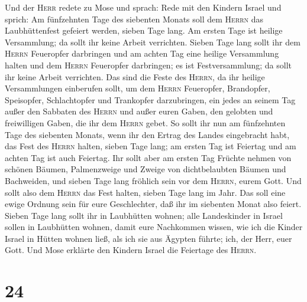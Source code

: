  Und der \textsc{Herr} redete zu Mose und sprach:
 Rede mit den Kindern Israel und sprich: Am fünfzehnten
Tage des siebenten Monats soll dem \textsc{Herrn} das Laubhüttenfest
gefeiert werden, sieben Tage lang.  Am ersten Tage ist
heilige Versammlung; da sollt ihr keine Arbeit verrichten.
 Sieben Tage lang sollt ihr dem \textsc{Herrn} Feueropfer
darbringen und am achten Tag eine heilige Versammlung halten und dem
\textsc{Herrn} Feueropfer darbringen; es ist Festversammlung; da sollt
ihr keine Arbeit verrichten.  Das sind die Feste des
\textsc{Herrn}, da ihr heilige Versammlungen einberufen sollt, um dem
\textsc{Herrn} Feueropfer, Brandopfer, Speisopfer, Schlachtopfer und
Trankopfer darzubringen, ein jedes an seinem Tag  außer
den Sabbaten des \textsc{Herrn} und außer euren Gaben, den gelobten und
freiwilligen Gaben, die ihr dem \textsc{Herrn} gebet.  So
sollt ihr nun am fünfzehnten Tage des siebenten Monats, wenn ihr den
Ertrag des Landes eingebracht habt, das Fest des \textsc{Herrn} halten,
sieben Tage lang; am ersten Tag ist Feiertag und am achten Tag ist auch
Feiertag.  Ihr sollt aber am ersten Tag Früchte nehmen
von schönen Bäumen, Palmenzweige und Zweige von dichtbelaubten Bäumen
und Bachweiden, und sieben Tage lang fröhlich sein vor dem
\textsc{Herrn}, eurem Gott.  Und sollt also dem
\textsc{Herrn} das Fest halten, sieben Tage lang im Jahr. Das soll eine
ewige Ordnung sein für eure Geschlechter, daß ihr im siebenten Monat
also feiert.  Sieben Tage lang sollt ihr in Laubhütten
wohnen; alle Landeskinder in Israel sollen in Laubhütten wohnen,
 damit eure Nachkommen wissen, wie ich die Kinder Israel
in Hütten wohnen ließ, als ich sie aus Ägypten führte; ich, der Herr,
euer Gott.  Und Mose erklärte den Kindern Israel die
Feiertage des \textsc{Herrn}.

\hypertarget{section-23}{%
\section{24}\label{section-23}}

